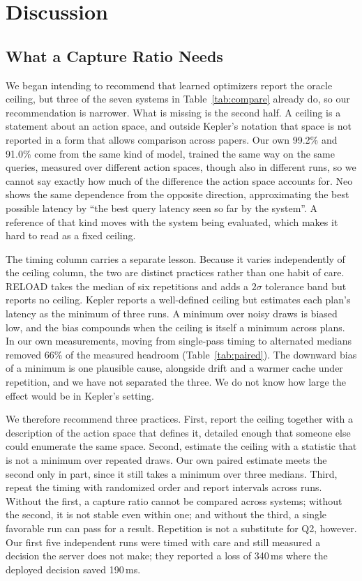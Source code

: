 \documentclass[conference]{IEEEtran}
\begin{document}
\section{Discussion}
\label{sec:discussion}

\subsection{What a Capture Ratio Needs}

We began intending to recommend that learned optimizers report the oracle
ceiling, but three of the seven systems in Table~\ref{tab:compare} already do,
so our recommendation is narrower. What is missing is the second half. A ceiling is a statement about an action
space, and outside Kepler's notation that space is not reported in a form that
allows comparison across papers. Our own 99.2\% and 91.0\% come from the same
kind of model, trained the same way on the same queries, measured over
different action spaces, though also in different runs, so we cannot say exactly how much of the
difference the action space accounts for. Neo shows the same dependence from the opposite direction,
approximating the best possible latency by ``the best query latency seen so far
by the system''. A reference of that kind moves with the system being
evaluated, which makes it hard to read as a fixed ceiling.

The timing column carries a separate lesson. Because it varies independently of
the ceiling column, the two are distinct practices rather than one habit of
care. RELOAD takes the median of six repetitions and adds a $2\sigma$ tolerance
band but reports no ceiling. Kepler reports a well-defined ceiling but estimates
each plan's latency as the minimum of three runs. A minimum over noisy draws is
biased low, and the bias compounds when the ceiling is itself a minimum across
plans. In our own measurements, moving from single-pass timing to alternated
medians removed 66\% of the measured headroom (Table~\ref{tab:paired}). The
downward bias of a minimum is one plausible cause, alongside drift and a warmer
cache under repetition, and we have not separated the three. We do not know how
large the effect would be in Kepler's setting.

We therefore recommend three practices. First, report the ceiling together with a
description of the action space that defines it, detailed enough that someone
else could enumerate the same space. Second, estimate the ceiling with a
statistic that is not a minimum over repeated draws. Our own paired estimate
meets the second only in part, since it still takes a minimum over three
medians. Third, repeat the timing with randomized order and report intervals
across runs. Without the first, a capture ratio cannot be compared across
systems; without the second, it is not stable even within one; and without the
third, a single favorable run can pass for a result. Repetition is not a
substitute for Q2, however. Our first five independent runs were timed with
care and still measured a decision the server does not make; they reported a
loss of 340\,ms where the deployed decision saved 190\,ms.
\end{document}
